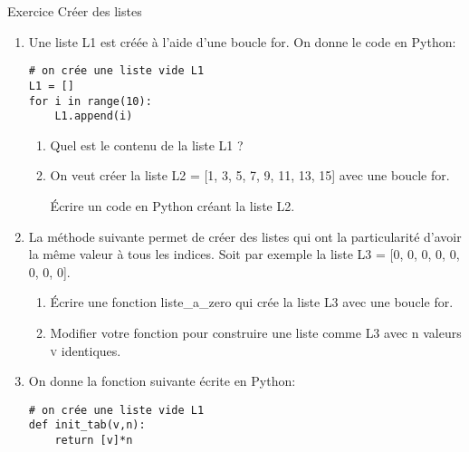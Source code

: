 \documentclass[11pt,a4paper]{article}
\newcounter{numexo}
\begin{document}
\begin{NSI}
{Exercice}{ Créer des listes}
\end{NSI}






\begin{enumerate}
\item Une liste \textsf{L1} est créée à l'aide d'une boucle \textsf{for}. On 
donne le code en Python:

\begin{lstlisting}
# on crée une liste vide L1
L1 = []
for i in range(10):
	L1.append(i)
\end{lstlisting}

\begin{enumerate}
\item Quel est le contenu de la liste L1 ?
\item On veut créer la liste \textsf{L2 = [1, 3, 5, 7, 9, 11, 13, 15]} avec une boucle \textsf{for}. 

Écrire un code en Python créant la liste \textsf{L2}.
\end{enumerate}
\item La méthode suivante permet de créer des listes qui ont la particularité d'avoir la même valeur à tous les indices. Soit par exemple la liste \textsf{L3 = [0, 0, 0, 0, 0, 0, 0, 0]}.
\begin{enumerate}
\item Écrire une fonction \textsf{liste\_a\_zero} qui crée la liste \textsf{L3} avec une boucle \textsf{for}.
\item Modifier votre fonction pour construire une liste comme \textsf{L3} avec \textsf{n} valeurs \textsc{v} identiques.
\end{enumerate}
\item On donne la fonction suivante écrite en Python:

\begin{lstlisting}
# on crée une liste vide L1
def init_tab(v,n):
	return [v]*n
	

\end{lstlisting}
\end{enumerate}
\end{document}
